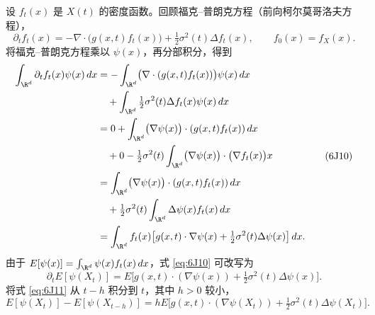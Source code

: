 设 $f_t(x)$ 是 $X(t)$ 的密度函数。回顾福克–普朗克方程（前向柯尔莫哥洛夫方程），
\begin{equation*}
  \partial_t f_t(x)=-\nabla\cdot\bigl(g(x,t)f_t(x)\bigr)
      +\tfrac12\sigma^2(t)\Delta f_t(x),\qquad f_0(x)=f_X(x).
  \tag{6J9}\label{eq:6J9}
\end{equation*}
将福克–普朗克方程乘以 $\psi(x)$，再分部积分，得到
\begin{equation*}
  \begin{aligned}
   \int_{\R^d}\partial_t f_t(x)\psi(x)\,dx
     &=-\int_{\R^d}\bigl(\nabla\cdot(g(x,t)f_t(x))\bigr)\psi(x)\,dx\\
     &\quad+\int_{\R^d}\tfrac12\sigma^2(t)\Delta f_t(x)\psi(x)\,dx\\
     &=0+\int_{\R^d}\bigl(\nabla\psi(x)\bigr)\cdot(g(x,t)f_t(x))\,dx\\
     &\quad+0-\tfrac12\sigma^2(t)
             \int_{\R^d}\bigl(\nabla\psi(x)\bigr)\cdot\bigl(\nabla f_t(x)\bigr)x\\
     &=\int_{\R^d}\bigl(\nabla\psi(x)\bigr)\cdot(g(x,t)f_t(x))\,dx\\
     &\quad+\tfrac12\sigma^2(t)\int_{\R^d}\Delta\psi(x)f_t(x)\,dx\\
     &=\int_{\R^d}f_t(x)
           \bigl[g(x,t)\cdot\nabla\psi(x)+\tfrac12\sigma^2(t)\Delta\psi(x)\bigr]\,dx.
  \end{aligned}
  \tag{6J10}\label{eq:6J10}
\end{equation*}
由于 $E[\psi(x)]=\int_{\R^d}\psi(x)f_t(x)\,dx$，式 \eqref{eq:6J10} 可改写为
\begin{equation*}
  \partial_t E[\psi(X_t)]
   =E\bigl[g(x,t)\cdot(\nabla\psi(x))+\tfrac12\sigma^2(t)\Delta\psi(x)\bigr].
  \tag{6J11}\label{eq:6J11}
\end{equation*}
将式 \eqref{eq:6J11} 从 $t-h$ 积分到 $t$，其中 $h>0$ 较小，
\begin{equation*}
  E[\psi(X_t)]-E[\psi(X_{t-h})]
    =h E\bigl[g(x,t)\cdot(\nabla\psi(X_t))+\tfrac12\sigma^2(t)\Delta\psi(X_t)\bigr].
  \tag{6J12}\label{eq:6J12}
\end{equation*}


